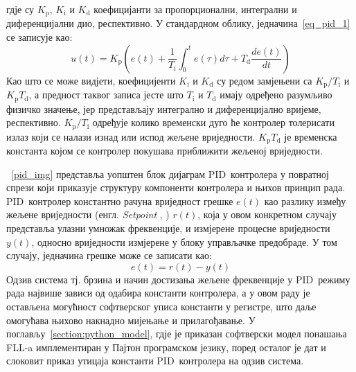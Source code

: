 \documentclass[master]{finthesis}
\makeatletter
\newcommand*{\engl}[2][\@empty]{%
    \edef\theacronym{#1}%
    (енгл. \foreignlanguage{english}{\emph{#2}%
    \ifx\theacronym\@empty \else , #1\fi})%
}
\def \FLL  {FLL} %
\def \PID  {PID} %
\makeatother
\begin{document}
гдје су $K_\text{p}$, $K_\text{i}$ и $K_\text{d}$ коефицијанти за пропорционални, интегрални и диференцијални дио, респективно. У стандардном облику, једначина~\ref{eq_pid_1} се записује као:
\begin{equation} 
	\label{eq_pid_2}
	u(t)= K_\text{p}\left(e(t) + \frac{1}{T_\text{i}}\int_{0}^{t}e(\tau)d\tau + T_\text{d}\frac{de(t)}{dt}\right)
\end{equation}
Као што се може видјети, коефицијенти $K_\text{i}$ и $K_\text{d}$ су редом замјењени са $K_\text{p}/T_\text{i}$ и $K_\text{p}T_\text{d}$, а предност таквог записа јесте што $T_\text{i}$ и $T_\text{d}$ имају одређено разумљиво физичко значење, јер представљају интегрално и диференцијално вријеме, респективно. $K_\text{p}/T_\text{i}$ одређује колико временски дуго ће контролер толерисати излаз који се налази изнад или испод жељене вриједности. $K_\text{p}T_\text{d}$ је временска константа којом се контролер покушава приближити жељеној вриједности.

\figurename~\ref{pid_img} представља уопштен блок дијаграм \PID\ контролера у повратној спрези који приказује структуру компоненти контролера и њихов принцип рада. \PID\ контролер константно рачуна вриједност грешке $e(t)$ као разлику између жељене вриједности \engl{Setpoint} $r(t)$, која у овом конкретном случају представља улазни умножак фреквенције, и измјерене процесне вриједности $y(t)$, односно вриједности измјерене у блоку управљачке предобраде. У том случају, једначина грешке може се записати као:
\begin{equation} 
	\label{eq_pid_err)}
	e(t) = r(t) - y(t)
\end{equation}
Одзив система тј. брзина и начин достизања жељене фреквенције у \PID\ режиму рада највише зависи од одабира константи контролера, а у овом раду је остављена могућност софтверског уписа константи у регистре, што даље омогућава њихово накнадно мијењање и прилагођавање. У поглављу~\ref{section:python_model}, гдје је приказан софтверски модел понашања \FLL-a имплементиран у Пајтон програмском језику, поред осталог је дат и слоковит приказ утицаја константи \PID\ контролера на одзив система.
\end{document}
